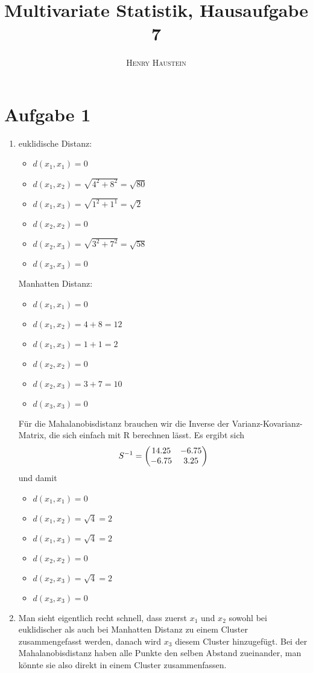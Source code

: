 \documentclass{article}
\title{\textbf{Multivariate Statistik, Hausaufgabe 7}}
\author{\textsc{Henry Haustein}}
\date{}
\begin{document}
	\maketitle
	
	\section*{Aufgabe 1}
	\begin{enumerate}[label=(\alph*)]
		\item euklidische Distanz:
		\begin{itemize}
			\item $d(x_1,x_1) = 0$
			\item $d(x_1,x_2) = \sqrt{4^2 + 8^2} = \sqrt{80}$
			\item $d(x_1,x_3) = \sqrt{1^2 + 1^1} = \sqrt{2}$
			\item $d(x_2,x_2) = 0$
			\item $d(x_2,x_3) = \sqrt{3^2 + 7^2} = \sqrt{58}$
			\item $d(x_3,x_3) = 0$
		\end{itemize}
		Manhatten Distanz:
		\begin{itemize}
			\item $d(x_1,x_1) = 0$
			\item $d(x_1,x_2) = 4 + 8 = 12$
			\item $d(x_1,x_3) = 1 + 1 = 2$
			\item $d(x_2,x_2) = 0$
			\item $d(x_2,x_3) = 3 + 7 = 10$
			\item $d(x_3,x_3) = 0$
		\end{itemize}
		Für die Mahalanobisdistanz brauchen wir die Inverse der Varianz-Kovarianz-Matrix, die sich einfach mit R berechnen lässt. Es ergibt sich
		\begin{align}
			S^{-1} = \begin{pmatrix}
				14.25 & -6.75 \\
				-6.75 & 3.25
			\end{pmatrix} \notag
		\end{align}
		und damit
		\begin{itemize}
			\item $d(x_1,x_1) = 0$
			\item $d(x_1,x_2) = \sqrt{4} = 2$
			\item $d(x_1,x_3) = \sqrt{4} = 2$
			\item $d(x_2,x_2) = 0$
			\item $d(x_2,x_3) = \sqrt{4} = 2$
			\item $d(x_3,x_3) = 0$
		\end{itemize}
		\item Man sieht eigentlich recht schnell, dass zuerst $x_1$ und $x_2$ sowohl bei euklidischer als auch bei Manhatten Distanz zu einem Cluster zusammengefasst werden, danach wird $x_3$ diesem Cluster hinzugefügt. Bei der Mahalanobisdistanz haben alle Punkte den selben Abstand zueinander, man könnte sie also direkt in einem Cluster zusammenfassen.
	\end{enumerate}
	
\end{document}
